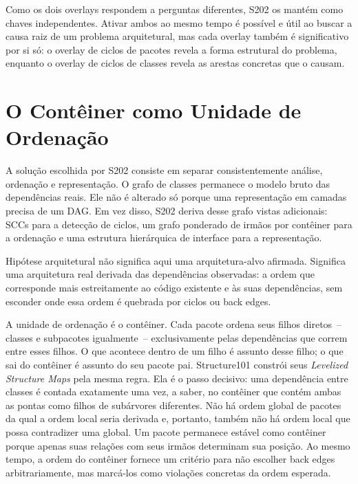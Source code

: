 \documentclass[a4paper,11pt]{article}
\begin{document}
Como os dois overlays respondem a perguntas diferentes, S202 os mant\'em como
chaves independentes. Ativar ambos ao mesmo tempo \'e poss\'ivel e \'util ao
buscar a causa raiz de um problema arquitetural, mas cada overlay tamb\'em \'e
significativo por si s\'o: o overlay de ciclos de pacotes revela a forma
estrutural do problema, enquanto o overlay de ciclos de classes revela as
arestas concretas que o causam.

\section{O Cont\^einer como Unidade de Ordena\c{c}\~ao}

A solu\c{c}\~ao escolhida por S202 consiste em separar consistentemente
an\'alise, ordena\c{c}\~ao e representa\c{c}\~ao. O grafo de classes permanece
o modelo bruto das depend\^encias reais. Ele n\~ao \'e alterado s\'o porque uma
representa\c{c}\~ao em camadas precisa de um DAG. Em vez disso, S202 deriva
desse grafo vistas adicionais: SCCs para a detec\c{c}\~ao de ciclos, um grafo
ponderado de irm\~aos por cont\^einer para a ordena\c{c}\~ao e uma estrutura
hier\'arquica de interface para a representa\c{c}\~ao.

Hip\'otese arquitetural n\~ao significa aqui uma arquitetura-alvo afirmada.
Significa uma arquitetura real derivada das depend\^encias observadas: a ordem
que corresponde mais estreitamente ao c\'odigo existente e \`as suas
depend\^encias, sem esconder onde essa ordem \'e quebrada por ciclos ou back
edges.

A unidade de ordena\c{c}\~ao \'e o cont\^einer. Cada pacote ordena seus filhos
diretos~-- classes e subpacotes igualmente~-- exclusivamente pelas
depend\^encias que correm entre esses filhos. O que acontece dentro de um filho
\'e assunto desse filho; o que sai do cont\^einer \'e assunto do seu pacote pai.
Structure101 constr\'oi seus \emph{Levelized Structure Maps} pela mesma regra.
Ela \'e o passo decisivo: uma depend\^encia entre classes \'e contada
exatamente uma vez, a saber, no cont\^einer que cont\'em ambas as pontas como
filhos de sub\'arvores diferentes. N\~ao h\'a ordem global de pacotes da qual a
ordem local seria derivada e, portanto, tamb\'em n\~ao h\'a ordem local que
possa contradizer uma global. Um pacote permanece est\'avel como cont\^einer
porque apenas suas rela\c{c}\~oes com seus irm\~aos determinam sua posi\c{c}\~ao.
Ao mesmo tempo, a ordem do cont\^einer fornece um crit\'erio para n\~ao
escolher back edges arbitrariamente, mas marc\'a-los como viola\c{c}\~oes
concretas da ordem esperada.
\end{document}
